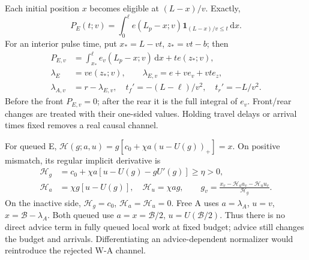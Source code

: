 \documentclass[11pt,a4paper]{article}
\newcommand{\dd}{\,\mathrm d}
\newcommand{\Bud}{\mathcal B}
\newcommand{\He}{\mathcal H}
\begin{document}
Each initial position $x$ becomes eligible at $(L-x)/v$. Exactly,
\begin{equation}
 P_E(t;v)=\int_0^\ell e(L_p-x;v)
             \mathbf1_{(L-x)/v\leq t}\dd x.
 \label{eq:arrival}
\end{equation}
For an interior pulse time, put $x_*=L-vt$, $z_*=vt-b$; then
\begin{align}
 P_{E,v}&=\int_{x_*}^\ell e_v(L_p-x;v)\dd x+t e(z_*;v),\nonumber\\
 \lambda_E&=v e(z_*;v),\qquad
 \lambda_{E,v}=e+v e_v+vt e_z,\nonumber\\
 \lambda_{A,v}&=r-\lambda_{E,v},\quad
 t_f'=-(L-\ell)/v^2,\quad t_r'=-L/v^2.
 \label{eq:arrivalderivative}
\end{align}
Before the front $P_{E,v}=0$; after the rear it is the full integral of
$e_v$. Front/rear changes are treated with their one-sided values. Holding
travel delays or arrival times fixed removes a real causal channel.

For queued E, $\He(g;a,u)=g[c_0+\chi a(u-U(g))_+]=x$. On positive
mismatch, its regular implicit derivative is
\begin{align}
 \He_g&=c_0+\chi a[u-U(g)-gU'(g)]\geq\eta>0,\nonumber\\
 \He_a&=\chi g[u-U(g)],\quad \He_u=\chi ag,\qquad
 g_v=\frac{x_v-\He_a a_v-\He_u u_v}{\He_g}.
 \label{eq:rootderivative}
\end{align}
On the inactive side, $\He_g=c_0$, $\He_a=\He_u=0$.
Free A uses $a=\lambda_A$, $u=v$, $x=\Bud-\lambda_A$.
Both queued use $a=x=\Bud/2$, $u=U(\Bud/2)$.
Thus there is no direct advice term in fully queued local work at fixed
budget; advice still changes the budget and arrivals. Differentiating an
advice-dependent normalizer would reintroduce the rejected W-A channel.
\end{document}
